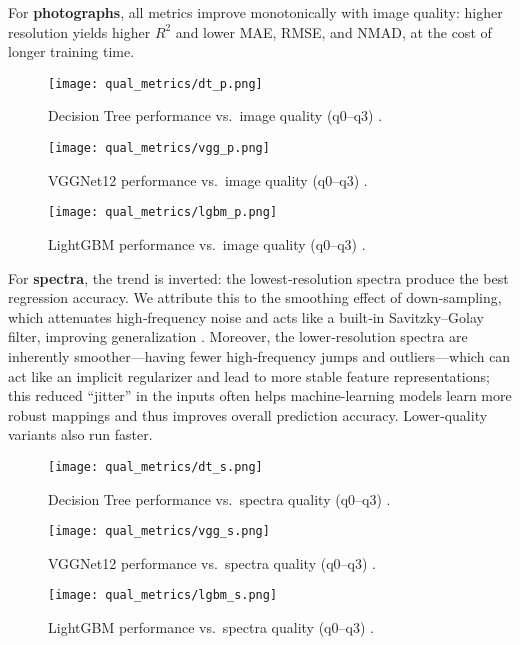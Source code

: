 \documentclass[english,bachelor,oneside]{ctufit-thesis}
\begin{document}
For \textbf{photographs}, all metrics improve monotonically with image quality: higher resolution yields higher $R^2$ and lower MAE, RMSE, and NMAD, at the cost of longer training time.  
\begin{figure}[H]
  \centering
  \texttt{[image: qual\_metrics/dt\_p.png]}
  \caption{Decision Tree performance vs.\ image quality (q0–q3) \cite{DTq}.}
  \label{fig:photo_quality_dt}
\end{figure}
\begin{figure}[H]
  \centering
  \texttt{[image: qual\_metrics/vgg\_p.png]}
  \caption{VGGNet12 performance vs.\ image quality (q0–q3) \cite{VGGq}.}
  \label{fig:photo_quality_vgg}
\end{figure}
\begin{figure}[H]
  \centering
  \texttt{[image: qual\_metrics/lgbm\_p.png]}
  \caption{LightGBM performance vs.\ image quality (q0–q3) \cite{lgbmq}.}
  \label{fig:photo_quality_lgbm}
\end{figure}
For \textbf{spectra}, the trend is inverted: the lowest‐resolution spectra produce the best regression accuracy. We attribute this to the smoothing effect of down‐sampling, which attenuates high‐frequency noise and acts like a built‐in Savitzky–Golay filter, improving generalization \cite{SavitzkyGolay1964}. 
Moreover, the lower‐resolution spectra are inherently smoother—having fewer high‐frequency jumps and outliers—which can act like an implicit regularizer and lead to more stable feature representations; this reduced “jitter” in the inputs often helps machine-learning models learn more robust mappings and thus improves overall prediction accuracy. Lower‐quality variants also run faster.  

\begin{figure}[H]
  \centering
  \texttt{[image: qual\_metrics/dt\_s.png]}
  \caption{Decision Tree performance vs.\ spectra quality (q0–q3) \cite{DTq}.}
  \label{fig:spec_quality_dt}
\end{figure}
\begin{figure}[H]
  \centering
  \texttt{[image: qual\_metrics/vgg\_s.png]}
  \caption{VGGNet12 performance vs.\ spectra quality (q0–q3) \cite{VGGq}.}
  \label{fig:spec_quality_vgg}
\end{figure}
\begin{figure}[H]
  \centering
  \texttt{[image: qual\_metrics/lgbm\_s.png]}
  \caption{LightGBM performance vs.\ spectra quality (q0–q3) \cite{lgbmq}.}
  \label{fig:spec_quality_lgbm}
\end{figure}
\end{document}
